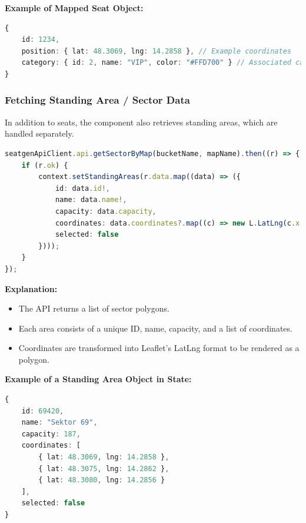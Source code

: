 \textbf{Example of Mapped Seat Object:}
\begin{lstlisting}[language=TypeScript, caption=Seat Object in State, label=lst:seat-object]
{
    id: 1234,
    position: { lat: 48.3069, lng: 14.2858 }, // Example coordinates
    category: { id: 2, name: "VIP", color: "#FFD700" } // Associated category
}
\end{lstlisting}

\subsubsection{Fetching Standing Area / Sector Data}
In addition to seats, the component also retrieves standing areas, which are handled separately.

\begin{lstlisting}[language=TypeScript, caption=Fetching Standing Areas, label=lst:fetch-standingareas]
seatgenApiClient.api.getSectorByMap(bucketName, mapName).then((r) => {
    if (r.ok) {
        context.setStandingAreas(r.data.map((data) => ({
            id: data.id!,
            name: data.name!,
            capacity: data.capacity,
            coordinates: data.coordinates?.map((c) => new L.LatLng(c.x!, c.y!)) ?? [],
            selected: false
        })));
    }
});
\end{lstlisting}

\textbf{Explanation:}
\begin{itemize}
    \item The API returns a list of sector polygons.
    \item Each area consists of a unique ID, name, capacity, and a list of coordinates.
    \item Coordinates are transformed into Leaflet’s LatLng format to be rendered as a polygon.
\end{itemize}

\textbf{Example of a Standing Area Object in State:}
\begin{lstlisting}[language=TypeScript, caption=Standing Area Object in State, label=lst:standingarea-object]
{
    id: 69420,
    name: "Sektor 69",
    capacity: 187,
    coordinates: [
        { lat: 48.3069, lng: 14.2858 },
        { lat: 48.3075, lng: 14.2862 },
        { lat: 48.3080, lng: 14.2856 }
    ],
    selected: false
}
\end{lstlisting}


